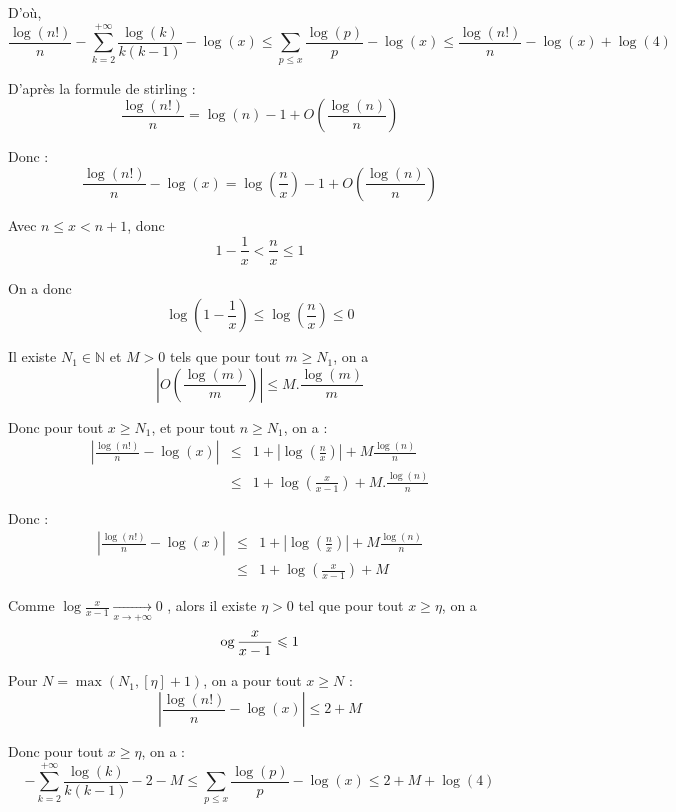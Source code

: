D'o{\`u},
\[ \frac{\log (n!)}{n} - \underset{k = 2}{\overset{+ \infty}{\sum}} \frac{\log
   (k)}{k (k - 1)} - \log (x) \leqslant \underset{p \leqslant x}{\sum}
   \frac{\log (p)}{p} - \log (x) \leqslant \frac{\log (n!)}{n} - \log (x) +
   \log (4) \]


D'apr{\`e}s la formule de stirling :
\[ \frac{\log (n!)}{n} = \log (n) - 1 + O \left( \frac{\log (n)}{n} \right) \]


Donc :
\[ \frac{\log (n!)}{n} - \log (x) = \log \left( \frac{n}{x} \right) - 1 + O
   \left( \frac{\log (n)}{n} \right) \]


Avec $n \leqslant x < n + 1$, donc
\[ 1 - \frac{1}{x} < \frac{n}{x} \leqslant 1 \]


On a donc
\[ \log \left( 1 - \frac{1}{x} \right) \leqslant \log \left( \frac{n}{x}
   \right) \leqslant 0 \]


Il existe $N_1 \in \mathbb{N}$ et $M > 0$ tels que pour tout $m \geqslant
N_1$, on a
\[ \left| O \left( \frac{\log (m)}{m} \right) \right| \leqslant M. \frac{\log
   (m)}{m} \]


Donc pour tout $x \geqslant N_1$, et pour tout $n \geqslant N_1$, on a :
\begin{eqnarray*}
  \left| \frac{\log (n!)}{n} - \log (x) \right| & \leqslant & 1 + \left| \log
  \left( \frac{n}{x} \right) \right| + M \frac{\log (n)}{n}\\
  & \leqslant & 1 + \log \left( \frac{x}{x - 1} \right) + M. \frac{\log
  (n)}{n}
\end{eqnarray*}


Donc :
\begin{eqnarray*}
  \left| \frac{\log (n!)}{n} - \log (x) \right| & \leqslant & 1 + \left| \log
  \left( \frac{n}{x} \right) \right| + M \frac{\log (n)}{n}\\
  & \leqslant & 1 + \log \left( \frac{x}{x - 1} \right) + M
\end{eqnarray*}


Comme $\log \frac{x}{x - 1} \underset{x \rightarrow + \infty}{\rightarrow} 0$
, alors il existe $\eta > 0$ tel que pour tout $x \geqslant \eta$, on a
\[ \operatorname{og} \frac{x}{x - 1} \leqslant 1 \]


Pour $N = \max (N_1, [\eta] + 1)$, on a pour tout $x \geqslant N$ :
\[ \left| \frac{\log (n!)}{n} - \log (x) \right| \leqslant 2 + M \]


Donc pour tout $x \geqslant \eta$, on a :
\[ - \underset{k = 2}{\overset{+ \infty}{\sum}} \frac{\log (k)}{k (k - 1)} - 2
   - M \leqslant \underset{p \leqslant x}{\sum} \frac{\log (p)}{p} - \log (x)
   \leqslant 2 + M + \log (4) \]



